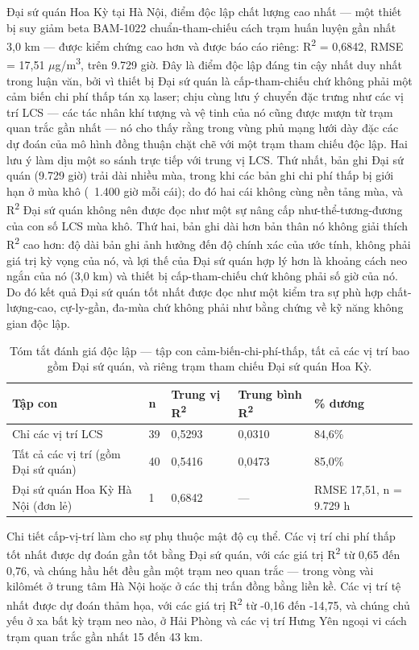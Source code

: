 Đại sứ quán Hoa Kỳ tại Hà Nội, điểm độc lập chất lượng cao nhất --- một thiết bị suy giảm beta BAM-1022 chuẩn-tham-chiếu cách trạm huấn luyện gần nhất 3,0 km --- được kiểm chứng cao hơn và được báo cáo riêng: R\textsuperscript{2} = 0,6842, RMSE = 17,51 $\mu$g/m\textsuperscript{3}, trên 9.729 giờ. Đây là điểm độc lập đáng tin cậy nhất duy nhất trong luận văn, bởi vì thiết bị Đại sứ quán là cấp-tham-chiếu chứ không phải một cảm biến chi phí thấp tán xạ laser; chịu cùng lưu ý chuyển đặc trưng như các vị trí LCS --- các tác nhân khí tượng và vệ tinh của nó cũng được mượn từ trạm quan trắc gần nhất --- nó cho thấy rằng trong vùng phủ mạng lưới dày đặc các dự đoán của mô hình đồng thuận chặt chẽ với một trạm tham chiếu độc lập. Hai lưu ý làm dịu một so sánh trực tiếp với trung vị LCS. Thứ nhất, bản ghi Đại sứ quán (9.729 giờ) trải dài nhiều mùa, trong khi các bản ghi chi phí thấp bị giới hạn ở mùa khô (~1.400 giờ mỗi cái); do đó hai cái không cùng nền tảng mùa, và R\textsuperscript{2} Đại sứ quán không nên được đọc như một sự nâng cấp như-thể-tương-đương của con số LCS mùa khô. Thứ hai, bản ghi dài hơn bản thân nó không giải thích R\textsuperscript{2} cao hơn: độ dài bản ghi ảnh hưởng đến độ chính xác của ước tính, không phải giá trị kỳ vọng của nó, và lợi thế của Đại sứ quán hợp lý hơn là khoảng cách neo ngắn của nó (3,0 km) và thiết bị cấp-tham-chiếu chứ không phải số giờ của nó. Do đó kết quả Đại sứ quán tốt nhất được đọc như một kiểm tra sự phù hợp chất-lượng-cao, cự-ly-gần, đa-mùa chứ không phải như bằng chứng về kỹ năng không gian độc lập.

{\small
\begin{longtable}{lllll}
\caption{Tóm tắt đánh giá độc lập --- tập con cảm-biến-chi-phí-thấp, tất cả các vị trí bao gồm Đại sứ quán, và riêng trạm tham chiếu Đại sứ quán Hoa Kỳ.}\\
\toprule
\textbf{Tập con} & \textbf{n} & \textbf{Trung vị R\textsuperscript{2}} & \textbf{Trung bình R\textsuperscript{2}} & \textbf{\% dương} \\
\midrule\endhead
Chỉ các vị trí LCS & 39 & 0,5293 & 0,0310 & 84,6\% \\
Tất cả các vị trí (gồm Đại sứ quán) & 40 & 0,5416 & 0,0473 & 85,0\% \\
Đại sứ quán Hoa Kỳ Hà Nội (đơn lẻ) & 1 & 0,6842 & --- & RMSE 17,51, n = 9.729 h \\
\bottomrule
\end{longtable}
}


Chi tiết cấp-vị-trí làm cho sự phụ thuộc mật độ cụ thể. Các vị trí chi phí thấp tốt nhất được dự đoán gần tốt bằng Đại sứ quán, với các giá trị R\textsuperscript{2} từ 0,65 đến 0,76, và chúng hầu hết đều gần một trạm neo quan trắc --- trong vòng vài kilômét ở trung tâm Hà Nội hoặc ở các thị trấn đồng bằng liền kề. Các vị trí tệ nhất được dự đoán thảm họa, với các giá trị R\textsuperscript{2} từ -0,16 đến -14,75, và chúng chủ yếu ở xa bất kỳ trạm neo nào, ở Hải Phòng và các vị trí Hưng Yên ngoại vi cách trạm quan trắc gần nhất 15 đến 43 km.

